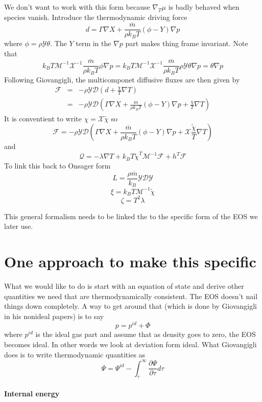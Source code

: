 \documentclass[11pt]{article}
\newcommand{\HeatFlux}{\boldsymbol{\mathcal{Q}}}
\newcommand{\SpeciesFlux}{\boldsymbol{\mathcal{F}}}
\newcommand{\mbar}{\overline{m}}
\begin{document}
We don't want to work with this form because $\nabla_T \mu$ is badly behaved when species vanish.
Introduce the thermodynamic driving force
\[
d = \Gamma \nabla X  + \frac{\mbar}{\rho k_B T} (\phi - Y) \nabla p
\]
where $\phi = \rho \mathcal{Y} \theta$.  The $Y$ term in the $\nabla p$ part makes thing frame invariant.
Note that
\[
k_B T \mathcal{M}^{-1} \mathcal{X}^{-1} \frac{\mbar}{\rho k_B T} \phi \nabla p = 
k_B T \mathcal{M}^{-1} \mathcal{X}^{-1} \frac{\mbar}{\rho k_B T} \rho \mathcal{Y} \theta \nabla p 
= \theta \nabla p
\]
Following Giovangigli,
the multicomponet diffusive fluxes are then given by
\begin{eqnarray}
\SpeciesFlux &=& -\rho \mathcal{Y} \mathcal{D} ( d + \frac{\chi}{T} \nabla T) \\
&=& -\rho \mathcal{Y} \mathcal{D} ( \Gamma \nabla X  + \frac{\mbar}{\rho k_B T} (\phi - Y) \nabla p
 + \frac{\chi}{T} \nabla T)
\end{eqnarray}
It is conventient to write $\chi = \mathcal{X}\tilde{\chi}$ so
\[
\SpeciesFlux = -\rho \mathcal{Y} \mathcal{D} ( \Gamma \nabla X  + \frac{\mbar}{\rho k_B T} (\phi - Y) \nabla p
 + \mathcal{X}\frac{\tilde{\chi}}{T} \nabla T)
\]
and
\[
\HeatFlux = - \lambda \nabla T + k_B T {\tilde{\chi}}^T \mathcal{M}^{-1} \SpeciesFlux + h^T \SpeciesFlux
\]
To link this back to Onsager form
\[
L = \frac{\rho \mbar}{k_B} \mathcal{Y} \mathcal{D} \mathcal{Y}
\]
\[
\xi = k_B T \mathcal{M}^{-1} \tilde{\chi}
\]
\[
\zeta = T^2 \lambda
\]

This general formalism needs to be linked the to the specific form of the EOS we later use.


\section{One approach to make this specific}

What we would like to do is start with an equation of state and derive other quantities we need that
are thermodynamically consistent.  The EOS doesn't nail things down completely.  A way to get around that
(which is done by Giovangigli in his nonideal papers) is to
say
\[
p = p^{id} + \Phi
\]
where $p^{id}$ is the ideal gas part and assume that as density goes to zero, the EOS becomes
ideal.  In other words we look at deviation form ideal.
What Giovangigli does is to write thermodynamic quantities as
\[
\Psi = \Psi^{id} - \int_\tau^\infty \frac{\partial \Psi}{\partial \tau} d \tau
\]

\paragraph{Internal energy} 
\end{document}
